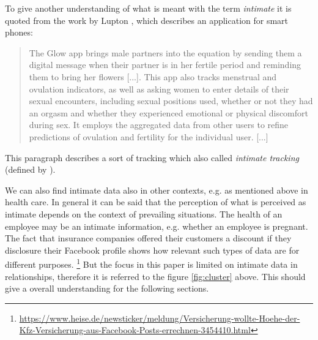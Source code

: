 To give another understanding of what is meant with the term \textit{intimate} it is quoted from the work by Lupton \cite{doi:10.1080/13691058.2014.920528}, which describes an application for smart phones:
\begin{quote}
	The	Glow app brings male partners into the equation by sending them a digital
	message when their partner is in her fertile period and reminding them to bring her flowers	[...]. This app also tracks menstrual and ovulation indicators, as well as asking women to enter details of their sexual encounters, including sexual positions used, whether or not they had an orgasm and whether they experienced emotional or physical discomfort during sex. It employs the aggregated data from other users to refine predictions of ovulation and fertility for the individual user. [...]
\end{quote}
This paragraph describes a sort of tracking which also called \textit{intimate tracking} (defined by \cite{doi:10.1080/15265161.2017.1409823}).

We can also find intimate data also in other contexts, e.g. as mentioned above in health care.
In general it can be said that the perception of what is perceived as intimate depends on the context of prevailing situations. The health of an employee may be an intimate information, e.g. whether an employee is pregnant. The fact that insurance companies offered their customers a discount if they disclosure their Facebook profile shows how relevant such types of data are for different purposes. \footnote{\url{https://www.heise.de/newsticker/meldung/Versicherung-wollte-Hoehe-der-Kfz-Versicherung-aus-Facebook-Posts-errechnen-3454410.html}}
But the focus in this paper is limited on intimate data in relationships, therefore it is referred to the figure \ref{fig:cluster} above. This should give a overall understanding for the following sections. 

